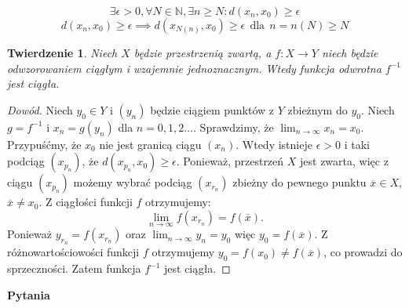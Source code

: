 \documentclass{article}
\newtheorem*{theorem}{Twierdzenie}
\begin{document}
\begin{equation*}
    \exists \epsilon > 0, \forall N \in \mathbb{N}, \exists n \geq N: d(x_n, x_0) \geq \epsilon
\end{equation*}
\begin{equation*}
    d(x_n , x_0) \geq \epsilon \implies d(x_{N(n)}, x_0) \geq \epsilon \ \ \mbox{dla} \ \ n = n(N) \geq N
\end{equation*}


\newpage
\begin{theorem}
    Niech \(X\) będzie przestrzenią zwartą, a \(f: X \to Y\) niech będzie odwzorowaniem
    ciągłym i wzajemnie jednoznacznym. Wtedy funkcja odwrotna \(f^{-1}\) jest ciągła.
\end{theorem}
\begin{proof}[Dowód]
    Niech \(y_0 \in Y\) i \((y_n)\) będzie ciągiem punktów z \(Y\) zbieżnym do \(y_0\).
    Niech \(g = f^{-1}\) i \(x_n = g(y_n)\) dla \(n = 0,1,2 \dots\). Sprawdzimy, że
    \(\lim_{n \to \infty} x_n = x_0\). Przypuśćmy, że \(x_0\) nie jest granicą ciągu \((x_n)\).
    Wtedy istnieje \(\epsilon > 0\) i taki podciąg \((x_{p_n})\), że \(d(x_{p_n}, x_0) \geq \epsilon\).
    Ponieważ, przestrzeń \(X\) jest zwarta, więc z ciągu \((x_{p_n})\) możemy wybrać podciąg \((x_{r_n})\)
    zbieżny do pewnego punktu \(\overline{x} \in X\), \(\overline{x} \neq x_0\). Z ciągłości funkcji
    \(f\) otrzymujemy:
    \begin{equation*}
        \lim_{n \to \infty} f(x_{r_n}) = f(\overline{x}).
    \end{equation*}
    Ponieważ \(y_{r_n} = f(x_{r_n})\) oraz \(\lim_{n \to \infty} y_n = y_0\) więc \(y_0 = f(\overline{x})\).
    Z różnowartościowości funkcji \(f\) otrzymujemy \(y_0 = f(x_0) \neq f(\overline{x})\), co prowadzi
    do sprzeczności. Zatem funkcja \(f^{-1}\) jest ciągła.
\end{proof}
\begin{center}
    \textbf{Pytania}
\end{center}
\end{document}
